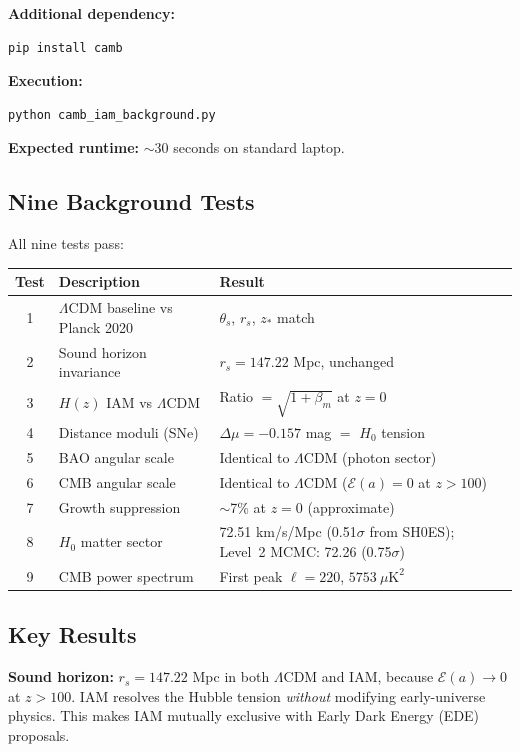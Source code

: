 \documentclass[11pt]{article}
\begin{document}
\textbf{Additional dependency:}
\begin{lstlisting}[language=bash]
pip install camb
\end{lstlisting}

\textbf{Execution:}
\begin{lstlisting}[language=bash]
python camb_iam_background.py
\end{lstlisting}

\textbf{Expected runtime:} $\sim$30 seconds on standard laptop.

\subsection{Nine Background Tests}

All nine tests pass:

\begin{center}
\begin{tabular}{clp{5.5cm}}
\toprule
\textbf{Test} & \textbf{Description} & \textbf{Result} \\
\midrule
1 & $\Lambda$CDM baseline vs Planck 2020 & $\theta_s$, $r_s$, $z_*$ match \\
2 & Sound horizon invariance & $r_s = 147.22$ Mpc, unchanged \\
3 & $H(z)$ IAM vs $\Lambda$CDM & Ratio $= \sqrt{1 + \beta_m}$ at $z=0$ \\
4 & Distance moduli (SNe) & $\Delta\mu = -0.157$ mag $=$ $H_0$ tension \\
5 & BAO angular scale & Identical to $\Lambda$CDM (photon sector) \\
6 & CMB angular scale & Identical to $\Lambda$CDM ($\mathcal{E}(a) = 0$ at $z > 100$) \\
7 & Growth suppression & $\sim$7\% at $z=0$ (approximate) \\
8 & $H_0$ matter sector & 72.51 km/s/Mpc (0.51$\sigma$ from SH0ES); Level~2 MCMC: 72.26 (0.75$\sigma$) \\
9 & CMB power spectrum & First peak $\ell = 220$, $5753~\mu\text{K}^2$ \\
\bottomrule
\end{tabular}
\end{center}

\subsection{Key Results}

\textbf{Sound horizon:} $r_s = 147.22$ Mpc in both $\Lambda$CDM and IAM, because $\mathcal{E}(a) \to 0$ at $z > 100$. IAM resolves the Hubble tension \textit{without} modifying early-universe physics. This makes IAM mutually exclusive with Early Dark Energy (EDE) proposals.
\end{document}
